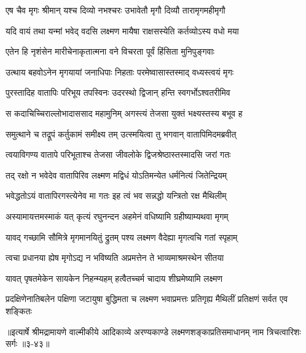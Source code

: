 \twolineshloka
{एष चैव मृगः श्रीमान् यश्च दिव्यो नभश्चरः}
{उभावेतौ मृगौ दिव्यौ तारामृगमहीमृगौ} %

\twolineshloka
{यदि वायं तथा यन्मां भवेद् वदसि लक्ष्मण}
{मायैषा राक्षसस्येति कर्तव्योऽस्य वधो मया} %

\twolineshloka
{एतेन हि नृशंसेन मारीचेनाकृतात्मना}
{वने विचरता पूर्वं हिंसिता मुनिपुङ्गवाः} %

\twolineshloka
{उत्थाय बहवोऽनेन मृगयायां जनाधिपाः}
{निहताः परमेष्वासास्तस्माद् वध्यस्त्वयं मृगः} %

\twolineshloka
{पुरस्तादिह वातापिः परिभूय तपस्विनः}
{उदरस्थो द्विजान् हन्ति स्वगर्भोऽश्वतरीमिव} %

\twolineshloka
{स कदाचिच्चिराल्लोभादाससाद महामुनिम्}
{अगस्त्यं तेजसा युक्तं भक्ष्यस्तस्य बभूव ह} %

\twolineshloka
{समुत्थाने च तद्रूपं कर्तुकामं समीक्ष्य तम्}
{उत्स्मयित्वा तु भगवान् वातापिमिदमब्रवीत्} %

\twolineshloka
{त्वयाविगण्य वातापे परिभूताश्च तेजसा}
{जीवलोके द्विजश्रेष्ठास्तस्मादसि जरां गतः} %

\twolineshloka
{तद् रक्षो न भवेदेव वातापिरिव लक्ष्मण}
{मद्विधं योऽतिमन्येत धर्मनित्यं जितेन्द्रियम्} %

\twolineshloka
{भवेद्धतोऽयं वातापिरगस्त्येनेव मा गतः}
{इह त्वं भव सन्नद्धो यन्त्रितो रक्ष मैथिलीम्} %

\twolineshloka
{अस्यामायत्तमस्माकं यत् कृत्यं रघुनन्दन}
{अहमेनं वधिष्यामि ग्रहीष्याम्यथवा मृगम्} %

\twolineshloka
{यावद् गच्छामि सौमित्रे मृगमानयितुं द्रुतम्}
{पश्य लक्ष्मण वैदेह्या मृगत्वचि गतां स्पृहाम्} %

\twolineshloka
{त्वचा प्रधानया ह्येष मृगोऽद्य न भविष्यति}
{अप्रमत्तेन ते भाव्यमाश्रमस्थेन सीतया} %

\twolineshloka
{यावत् पृषतमेकेन सायकेन निहन्म्यहम्}
{हत्वैतच्चर्म चादाय शीघ्रमेष्यामि लक्ष्मण} %

\twolineshloka
{प्रदक्षिणेनातिबलेन पक्षिणा जटायुषा बुद्धिमता च लक्ष्मण}
{भवाप्रमत्तः प्रतिगृह्य मैथिलीं प्रतिक्षणं सर्वत एव शङ्कितः} %


॥इत्यार्षे श्रीमद्रामायणे वाल्मीकीये आदिकाव्ये अरण्यकाण्डे लक्ष्मणशङ्काप्रतिसमाधानम् नाम त्रिचत्वारिशः सर्गः ॥३-४३॥
